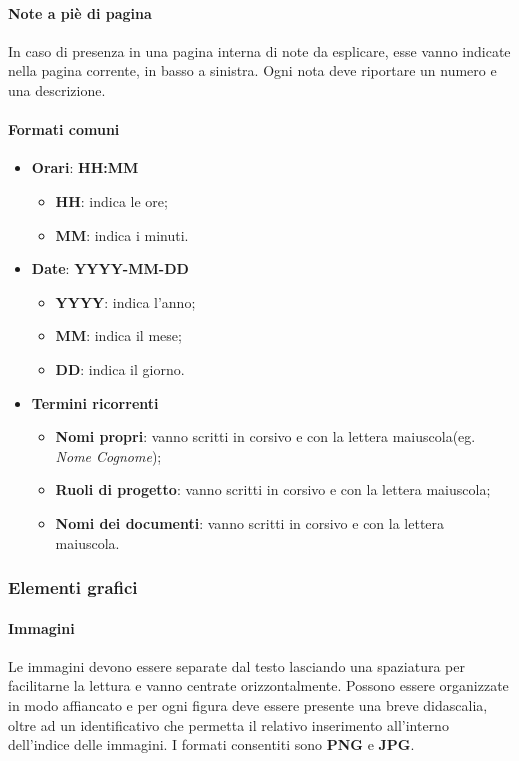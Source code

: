 \paragraph{Note a piè di pagina} \Spazio
In caso di presenza in una pagina interna di note da esplicare, esse vanno indicate nella pagina corrente, in basso a sinistra. Ogni nota deve riportare un numero e una descrizione.

\paragraph{Formati comuni} 
\begin{itemize}
	\item \textbf{Orari}: \textbf{HH:MM}
	\begin{itemize}
		\item \textbf{HH}: indica le ore;
		\item \textbf{MM}: indica i minuti.
	\end{itemize}
	\item \textbf{Date}: \textbf{YYYY-MM-DD}
	\begin{itemize}
		\item \textbf{YYYY}: indica l'anno;
		\item \textbf{MM}: indica il mese;
		\item \textbf{DD}: indica il giorno.
	\end{itemize}
	\item \textbf{Termini ricorrenti}
	\begin{itemize}
		\item \textbf{Nomi propri}: vanno scritti in corsivo e con la lettera maiuscola(eg. \emph{Nome Cognome});
		\item \textbf{Ruoli di progetto}: vanno scritti in corsivo e con la lettera maiuscola;
		\item \textbf{Nomi dei documenti}: vanno scritti in corsivo e con la lettera maiuscola.
	\end{itemize}
\end{itemize}

\subsubsection{Elementi grafici}
\paragraph{Immagini} \Spazio
Le immagini devono essere separate dal testo lasciando una spaziatura per facilitarne la lettura e vanno centrate orizzontalmente. Possono essere organizzate in modo affiancato e per ogni figura deve essere presente una breve didascalia, oltre ad un identificativo che permetta il relativo inserimento all’interno dell’indice delle
immagini. I formati consentiti sono \textbf{PNG} e \textbf{JPG}.
